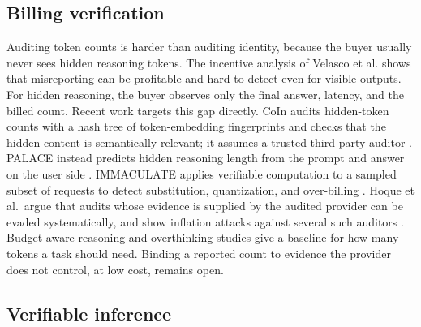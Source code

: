 \documentclass[sigconf]{acmart}
\begin{document}
\subsection{Billing verification}\label{billing-verification}

Auditing token counts is harder than auditing identity, because the buyer usually never sees hidden reasoning tokens. The incentive analysis of Velasco et al. \cite{velasco2025overcharging} shows that misreporting can be profitable and hard to detect even for visible outputs. For hidden reasoning, the buyer observes only the final answer, latency, and the billed count. Recent work targets this gap directly. CoIn audits hidden-token counts with a hash tree of token-embedding fingerprints and checks that the hidden content is semantically relevant; it assumes a trusted third-party auditor \cite{sun2025coin}. PALACE instead predicts hidden reasoning length from the prompt and answer on the user side \cite{wang2025palace}. IMMACULATE applies verifiable computation to a sampled subset of requests to detect substitution, quantization, and over-billing \cite{guo2026immaculate}. Hoque et al.\ argue that audits whose evidence is supplied by the audited provider can be evaded systematically, and show inflation attacks against several such auditors \cite{hoque2026tokeninflation}. Budget-aware reasoning \cite{han2024tokenbudget} and overthinking studies \cite{chen2024overthinking} give a baseline for how many tokens a task should need. Binding a reported count to evidence the provider does not control, at low cost, remains open.

\subsection{Verifiable inference}\label{verifiable-inference}
\end{document}
